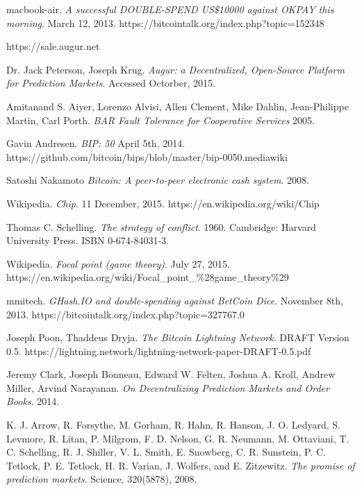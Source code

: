 \documentclass[onecolumn]{article}
\begin{document}
\onecolumn
\begin{thebibliography}{9}

	macbook-air.
	\emph{A successful DOUBLE-SPEND US\$10000 against OKPAY this morning}.
	March 12, 2013.
	https://bitcointalk.org/index.php?topic=152348

	https://sale.augur.net

	Dr. Jack Peterson, Joseph Krug.
	\emph{Augur: a Decentralized, Open-Source Platform for Prediction Markets}.
	Accessed Octorber, 2015.

	Amitanand S. Aiyer, Lorenzo Alvisi, Allen Clement, Mike Dahlin, Jean-Philippe Martin, Carl Porth.
	\emph{BAR Fault Tolerance for Cooperative Services}
	2005.


	Gavin Andresen.
	\emph{BIP: 50}
	April 5th, 2014.
	https://github.com/bitcoin/bips/blob/master/bip-0050.mediawiki

	Satoshi Nakamoto
	\emph{Bitcoin: A peer-to-peer electronic cash system}.
	2008.

	Wikipedia.
	\emph{Chip}.
	11 December, 2015.
	https://en.wikipedia.org/wiki/Chip

	Thomas C. Schelling.
	\emph{The strategy of conflict}.
	1960.
	Cambridge: Harvard University Press.
	ISBN 0-674-84031-3.

	Wikipedia.
	\emph{Focal point (game theory)}.
	July 27, 2015.
	https://en.wikipedia.org/wiki/Focal\_point\_\%28game\_theory\%29

	mmitech.
	\emph{GHash.IO and double-spending against BetCoin Dice}.
	November 8th, 2013.
	https://bitcointalk.org/index.php?topic=327767.0

	Joseph Poon, Thaddeus Dryja.
	\emph{The Bitcoin Lightning Network}.
	DRAFT Version 0.5.
	https://lightning.network/lightning-network-paper-DRAFT-0.5.pdf

	Jeremy Clark, Joseph Bonneau, Edward W. Felten, Joshua A. Kroll, Andrew Miller, Arvind Narayanan.
	\emph{On Decentralizing Prediction Markets and Order Books}.
	2014.

	K. J. Arrow, R. Forsythe, M. Gorham, R. Hahn, R. Hanson, J. O. Ledyard, S. Levmore, R. Litan, P. Milgrom, F. D. Nelson, G. R. Neumann, M. Ottaviani, T. C. Schelling, R. J. Shiller, V. L. Smith, E. Snowberg, C. R. Sunstein, P. C. Tetlock, P. E. Tetlock, H. R. Varian, J. Wolfers, and E. Zitzewitz. 
	\emph{The promise of prediction markets}.
	Science, 320(5878), 2008.


\end{thebibliography}
\end{document}
